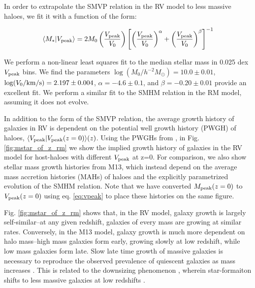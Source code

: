 \documentclass[a4paper,fleqn,usenatbib]{mnras}
\begin{document}
In order to extrapolate the SMVP relation in the RV model to less massive haloes, we fit it with a function of the form:
%
\begin{linenomath}
\begin{equation}
\label{eq:smvp_relation}
\langle M_* | V_{\rm peak} \rangle = 2M_0\left(\frac{V_{\rm peak}}{V_0}\right)\left[\left(\frac{V_{\rm peak}}{V_0}\right)^{\alpha}+\left(\frac{V_{\rm peak}}{V_0}\right)^{\beta}\right]^{-1}
\end{equation}
\end{linenomath}
%
We perform a non-linear least squares fit to the median stellar mass in 0.025 dex $V_{\rm peak}$ bins.  We find the parameters $\log(M_0/h^{-2}M_{\odot})=10.0 \pm 0.01$, $\log(V_0/{\rm km/s})=2.197 \pm 0.004$, $\alpha=-4.6 \pm 0.1$, and $\beta=-0.20 \pm 0.01$ provide an excellent fit.  We perform a similar fit to the SMHM relation in the RM model, assuming it does not evolve.

In addition to the form of the SMVP relation, the average growth history of galaxies in RV is dependent on the potential well growth history (PWGH) of haloes, $\langle V_{\rm peak}| V_{\rm peak}(z=0) \rangle(z)$.  Using the PWGHs from \citet{Bosch:2014cu}, in Fig. \ref{fig:mstar_of_z_rm} we show the implied growth history of galaxies in the RV model for host-haloes with different $V_{\rm peak}$ at z=0.  For comparison, we also show stellar mass growth histories from M13, which instead depend on the average mass accretion histories (MAHs) of haloes and the explicitly parametrized evolution of the SMHM relation.  Note that we have converted $M_{\rm peak}(z=0)$ to $V_{\rm peak}(z=0)$ using eq. \ref{eq:vpeak} to place these histories on the same figure.  

Fig. \ref{fig:mstar_of_z_rm} shows that, in the RV model, galaxy growth is largely self-similar--at any given redshift, galaxies of every mass are growing at similar rates.  Conversely, in the M13 model, galaxy growth is much more dependent on halo mass--high mass galaxies form early, growing slowly at low redshift, while low mass galaxies form late.  Slow late time growth of massive galaxies is necessary to reproduce the observed prevalence of quiescent galaxies as mass increases \citep[e.g.][]{vandenBosch:2008fv, Wetzel:2012lk}.  This is related to the downsizing phenomenon \citep{Neistein:2006fl}, wherein star-formaiton shifts to less massive galaxies at low redshifts \citep[e.g.][]{Kodama:2004gb, Jimenez:2005gj, Juneau:2005ig, Bell:2005hs, Bundy:2006em}.  
\end{document}
